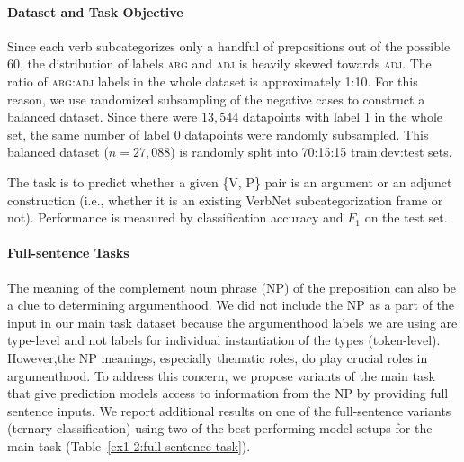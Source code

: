 \documentclass[letterpaper]{article} %
\begin{document}
\paragraph{Dataset and Task Objective}  Since each verb subcategorizes only a handful of prepositions out of the possible 60, the distribution of labels \textsc{arg} and \textsc{adj} is heavily skewed towards \textsc{adj}. The ratio of \textsc{arg}:\textsc{adj} labels in the whole dataset is approximately 1:10. For this reason, we use randomized subsampling of the negative cases to construct a balanced dataset. Since there were $13,544$ datapoints with label 1 in the whole set, the same number of label 0 datapoints were randomly subsampled. This balanced dataset ($n=27,088$) is randomly split into 70:15:15 train:dev:test sets.

The task is to predict whether a given \textsc{\{V, P\}} pair is an argument or an adjunct construction (i.e., whether it is an existing VerbNet subcategorization frame or not). Performance is measured by classification accuracy and $F_1$ on the test set. 

\paragraph{Full-sentence Tasks} The meaning of the complement noun phrase (NP) of the preposition can also be a clue to determining argumenthood. We did not include the NP as a part of the input in our main task dataset because the argumenthood labels we are using are type-level and not labels for individual instantiation of the types (token-level). However,the NP meanings, especially thematic roles, do play crucial roles in argumenthood. To address this concern, we propose variants of the main task that give prediction models access to information from the NP by providing full sentence inputs. We report additional results on one of the full-sentence variants (ternary classification) using two of the best-performing model setups for the main task (Table~\ref{ex1-2:full sentence task}).
\end{document}
